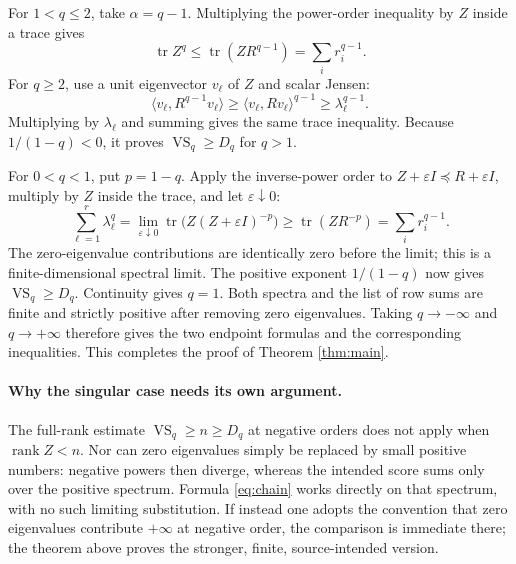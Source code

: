 \documentclass[11pt]{article}
\newcommand{\tr}{\operatorname{tr}}
\newcommand{\VS}{\operatorname{VS}}
\begin{document}
For $1<q\leq2$, take $\alpha=q-1$. Multiplying the power-order inequality
by $Z$ inside a trace gives
\[
 \tr Z^q\leq\tr(ZR^{q-1})=\sum_i r_i^{q-1}.
\]
For $q\geq2$, use a unit eigenvector $v_\ell$ of $Z$ and scalar Jensen:
\[
 \langle v_\ell,R^{q-1}v_\ell\rangle
 \geq\langle v_\ell,Rv_\ell\rangle^{q-1}
 \geq\lambda_\ell^{q-1}.
\]
Multiplying by $\lambda_\ell$ and summing gives the same trace inequality.
Because $1/(1-q)<0$, it proves $\VS_q\geq D_q$ for $q>1$.

For $0<q<1$, put $p=1-q$. Apply the inverse-power order to
$Z+\varepsilon I\preceq R+\varepsilon I$, multiply by $Z$ inside the
trace, and let $\varepsilon\downarrow0$:
\[
 \sum_{\ell=1}^r\lambda_\ell^q
 =\lim_{\varepsilon\downarrow0}\tr\bigl(Z(Z+\varepsilon I)^{-p}\bigr)
 \geq\tr(ZR^{-p})=\sum_i r_i^{q-1}.
\]
The zero-eigenvalue contributions are identically zero before the limit;
this is a finite-dimensional spectral limit. The positive exponent
$1/(1-q)$ now gives $\VS_q\geq D_q$. Continuity gives $q=1$.
Both spectra and the list of row sums are finite and strictly positive
after removing zero eigenvalues. Taking $q\to-\infty$ and $q\to+\infty$
therefore gives the two endpoint formulas and the corresponding inequalities.
This completes the proof of Theorem \ref{thm:main}.

\paragraph{Why the singular case needs its own argument.}
The full-rank estimate $\VS_q\geq n\geq D_q$ at negative orders does not
apply when $\operatorname{rank}Z<n$. Nor can zero eigenvalues simply be
replaced by small positive numbers: negative powers then diverge, whereas
the intended score sums only over the positive spectrum. Formula
\eqref{eq:chain} works directly on that spectrum, with no such limiting
substitution. If instead one adopts the convention that zero eigenvalues
contribute $+\infty$ at negative order, the comparison is immediate there;
the theorem above proves the stronger, finite, source-intended version.
\end{document}
